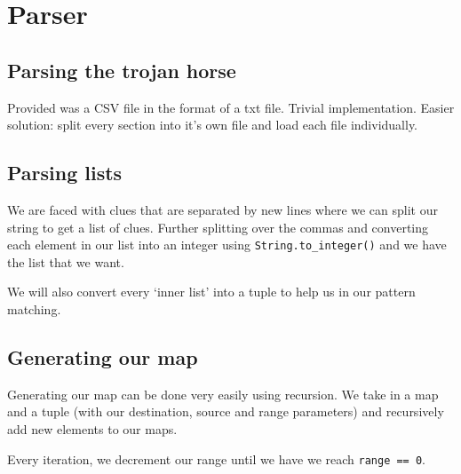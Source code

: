 \section{Parser}
\subsection{Parsing the trojan horse}
Provided was a CSV file in the format of a txt file. 
Trivial implementation. Easier solution: split every section into it's own file and load each file individually.

\subsection{Parsing lists}
We are faced with clues that are separated by new lines where we can split our string to get a list of clues. Further splitting over the commas and converting each element in our list into an integer using \texttt{String.to\_integer()} and we have the list that we want.



We will also convert every `inner list' into a tuple to help us in our pattern matching.

\subsection{Generating our map}
Generating our map can be done very easily using recursion. We take in a map and a tuple (with our destination, source and range parameters) and recursively add new elements to our maps.

Every iteration, we decrement our range until we have we reach \texttt{range == 0}.


